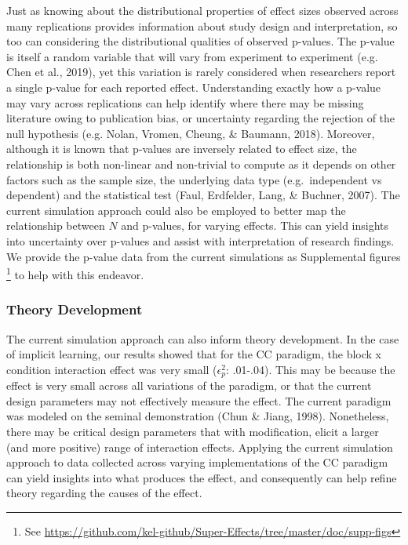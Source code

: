 \documentclass[
  man]{apa6}
\begin{document}
Just as knowing about the distributional properties of effect sizes observed across many replications provides information about study design and interpretation, so too can considering the distributional qualities of observed p-values. The p-value is itself a random variable that will vary from experiment to experiment (e.g. Chen et al., 2019), yet this variation is rarely considered when researchers report a single p-value for each reported effect. Understanding exactly how a p-value may vary across replications can help identify where there may be missing literature owing to publication bias, or uncertainty regarding the rejection of the null hypothesis (e.g. Nolan, Vromen, Cheung, \& Baumann, 2018). Moreover, although it is known that p-values are inversely related to effect size, the relationship is both non-linear and non-trivial to compute as it depends on other factors such as the sample size, the underlying data type (e.g.~independent vs dependent) and the statistical test (Faul, Erdfelder, Lang, \& Buchner, 2007). The current simulation approach could also be employed to better map the relationship between \(N\) and p-values, for varying effects. This can yield insights into uncertainty over p-values and assist with interpretation of research findings. We provide the p-value data from the current simulations as Supplemental figures \footnote{See \url{https://github.com/kel-github/Super-Effects/tree/master/doc/supp-figs}} to help with this endeavor.

\hypertarget{theory-development}{%
\subsubsection{Theory Development}\label{theory-development}}

The current simulation approach can also inform theory development. In the case of implicit learning, our results showed that for the CC paradigm, the block x condition interaction effect was very small (\(\epsilon_{p}^2\): .01-.04). This may be because the effect is very small across all variations of the paradigm, or that the current design parameters may not effectively measure the effect. The current paradigm was modeled on the seminal demonstration (Chun \& Jiang, 1998). Nonetheless, there may be critical design parameters that with modification, elicit a larger (and more positive) range of interaction effects. Applying the current simulation approach to data collected across varying implementations of the CC paradigm can yield insights into what produces the effect, and consequently can help refine theory regarding the causes of the effect.
\end{document}
